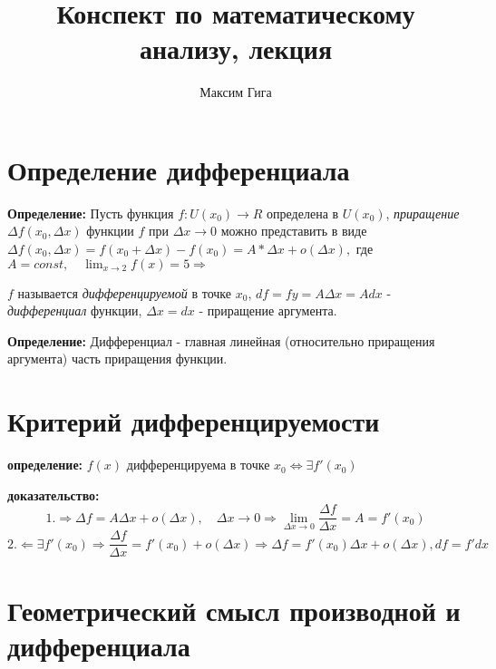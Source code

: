 \documentclass[fleqn, 12pt]{article}
\author{Максим Гига}
\title{Конспект по математическому анализу, лекция \textnumero 12}
\begin{document}
\onehalfspacing
\maketitle

\section{Определение дифференциала}

\textbf{Определение:}
Пусть функция $f: U(x_0) \rightarrow R$ определена в $U(x_0)$,
\textit{приращение} $\Delta f(x_0, \Delta x)$ функции $f$
при $\Delta x \to 0$ можно представить в виде
\begin{math}
	\Delta f(x_0, \Delta x) = f(x_0 + \Delta x) - f(x_0) = A * \Delta x + o(\Delta x),
\end{math}
где
\begin{math}
	A = const, \quad \lim_{x \to 2} f(x) = 5 \Rightarrow
\end{math}

\(f\) называется \textit{дифференцируемой} в точке
\(x_0\), \(df = fy = A \Delta x = A d x\) -
\textit{дифференциал} функции, \(\Delta x = d x\) - приращение аргумента.

\textbf{Определение:}
Дифференциал - главная линейная (относительно приращения аргумента) часть
приращения функции.

\section{Критерий дифференцируемости}

\textbf{определение:}
\(f(x)\) дифференцируема в точке \(x_0 \Leftrightarrow \exists f'(x_0) \)

\textbf{доказательство:}
\begin{displaymath}
	1. \Rightarrow
	\Delta f = A \Delta x + o(\Delta x), \quad \Delta x \to 0 \Rightarrow
	\lim_{\Delta x \to 0} \frac{\Delta f}{\Delta x} = A = f'(x_0)
\end{displaymath}
\begin{displaymath}
	2. \Leftarrow
	\exists f'(x_0) \Rightarrow \frac{\Delta f}{\Delta x} =
	f'(x_0) + o(\Delta x) \Rightarrow \Delta f = f'(x_0) \Delta x + o(\Delta x),
	d f = f' dx
\end{displaymath}

\section{Геометрический смысл производной и дифференциала}
\end{document}
